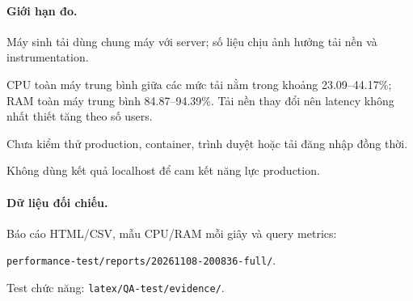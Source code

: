 \paragraph{Giới hạn đo.}

Máy sinh tải dùng chung máy với server; số liệu chịu ảnh hưởng tải nền và instrumentation.

CPU toàn máy trung bình giữa các mức tải nằm trong khoảng 23.09--44.17\%; RAM toàn máy trung bình 84.87--94.39\%. Tải nền thay đổi nên latency không nhất thiết tăng theo số users.

Chưa kiểm thử production, container, trình duyệt hoặc tải đăng nhập đồng thời.

Không dùng kết quả localhost để cam kết năng lực production.

\paragraph{Dữ liệu đối chiếu.}

Báo cáo HTML/CSV, mẫu CPU/RAM mỗi giây và query metrics:

\texttt{performance-test/reports/}\allowbreak\texttt{20261108-200836-full/}.

Test chức năng: \texttt{latex/QA-test/evidence/}.
